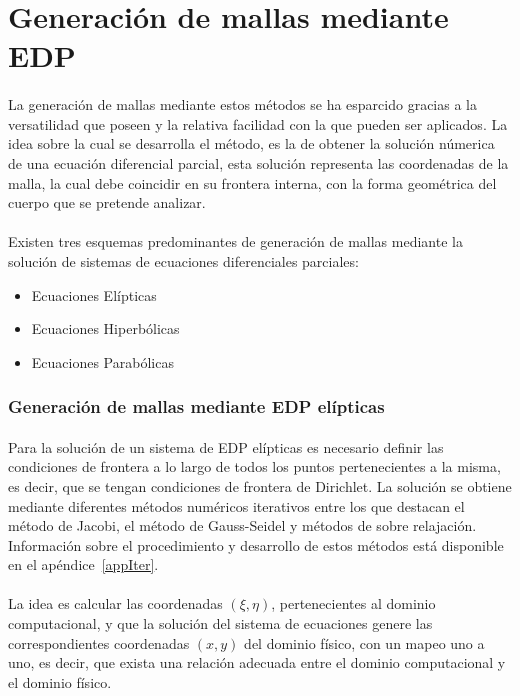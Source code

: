 \documentclass[letterpaper, openright, 12pt]{book}
\begin{document}
\section{Generación de mallas mediante EDP}
    \paragraph*{}
    La generación de mallas mediante estos métodos se ha esparcido gracias a
    la versatilidad que poseen y la relativa facilidad con la que pueden ser
    aplicados. La idea sobre la cual se desarrolla el método, es la de
    obtener la solución númerica de una ecuación diferencial parcial, esta
    solución representa las coordenadas de la malla, la cual debe coincidir
    en su frontera interna, con la forma geométrica del cuerpo que se
    pretende analizar.\cite{siladicParabolic}

    \paragraph*{}
    Existen tres esquemas predominantes de generación de mallas mediante la
    solución de sistemas de ecuaciones diferenciales parciales:
    \begin{itemize}
        \item Ecuaciones Elípticas
        \item Ecuaciones Hiperbólicas
        \item Ecuaciones Parabólicas
    \end{itemize}

    \subsubsection{Generación de mallas mediante EDP elípticas}
    \paragraph*{}
    Para la solución de un sistema de EDP elípticas es necesario definir las
    condiciones de frontera a lo largo de todos los puntos pertenecientes a la
    misma, es decir, que se tengan condiciones de frontera de Dirichlet.
    La solución se obtiene mediante diferentes métodos numéricos iterativos
    entre los que destacan el método de Jacobi, el método de Gauss-Seidel y
    métodos de sobre relajación. Información sobre el procedimiento y
    desarrollo de estos métodos está disponible en el apéndice~\ref{appIter}.

    \paragraph*{}
    La idea es calcular las coordenadas $(\xi, \eta)$, pertenecientes al
    dominio computacional, y que la solución del sistema de ecuaciones genere
    las correspondientes coordenadas $(x, y)$ del dominio físico, con un mapeo
    uno a uno, es decir, que exista una relación adecuada entre el dominio
    computacional y el dominio físico.
\end{document}
